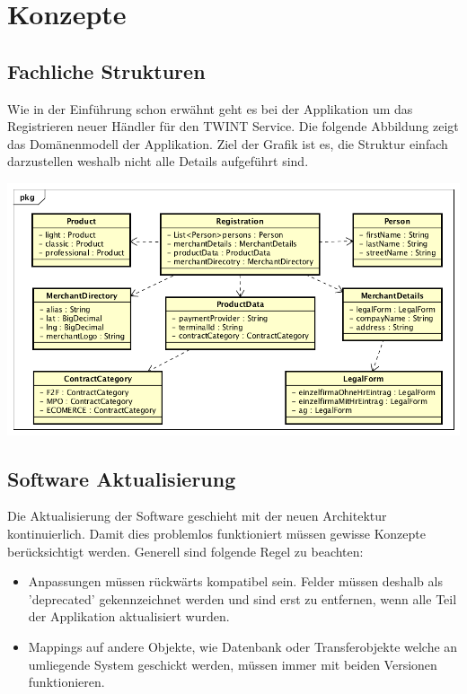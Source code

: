 \graphicspath{{./images/}}

\chapter{Konzepte}

\section{Fachliche Strukturen}

Wie in der Einführung schon erwähnt geht es bei der Applikation um das Registrieren neuer Händler für den TWINT Service. Die folgende Abbildung zeigt das Domänenmodell der Applikation. Ziel der Grafik ist es, die Struktur einfach darzustellen weshalb nicht alle Details aufgeführt sind. 

\begin{center}
	\includegraphics[scale=0.6]{DomainModel.png}
\end{center}

\section{Software Aktualisierung}
\label{software-update}

Die Aktualisierung der Software geschieht mit der neuen Architektur kontinuierlich. Damit dies problemlos funktioniert müssen gewisse Konzepte berücksichtigt werden. Generell sind folgende Regel zu beachten:
\begin{itemize}
	\item Anpassungen müssen rückwärts kompatibel sein. Felder müssen deshalb als 'deprecated' gekennzeichnet werden und sind erst zu entfernen, wenn alle Teil der Applikation aktualisiert wurden.
	\item Mappings auf andere Objekte, wie Datenbank oder Transferobjekte welche an umliegende System geschickt werden, müssen immer mit beiden Versionen funktionieren.
\end{itemize}

